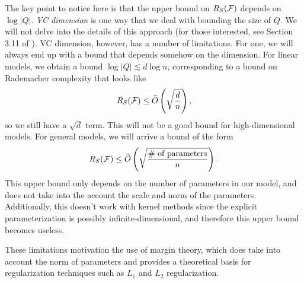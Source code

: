The key point to notice here is that the upper bound on $R_S(\mathcal F)$ depends on $\log |Q|$. \textit{VC dimension} is one way that we deal with bounding the size of $Q$. We will not delve into the details of this approach (for those interested, see Section 3.11 of \cite{percynotes}). VC dimension, however, has a number of limitations. For one, we will always end up with a bound that depends somehow on the dimension. For linear models, we obtain a bound $\log |Q| \lesssim d \log n$, corresponding to a bound on Rademacher complexity that looks like
\begin{equation}
R_S(\mathcal F) \leq \widetilde{O} \left( \sqrt{\frac{d}{n}} \right),
\end{equation}
so we still have a $\sqrt{d}$ term. This will not be a good bound for high-dimensional models. For general models, we will arrive a bound of the form 
\begin{equation}
R_S(\mathcal F) \leq \widetilde{O} \left( \sqrt{\frac{\text{\# of parameters}}{n}} \right).
\end{equation}
This upper bound only depends on the number of parameters in our model, and does not take into the account the scale and norm of the parameters. Additionally, this doesn't work with kernel methods since the explicit parameterization is possibly infinite-dimensional, and therefore this upper bound becomes useless.

These limitations motivation the use of margin theory, which does take into account the norm of parameters and provides a theoretical basis for regularization techniques such as $L_1$ and $L_2$ regularization.

